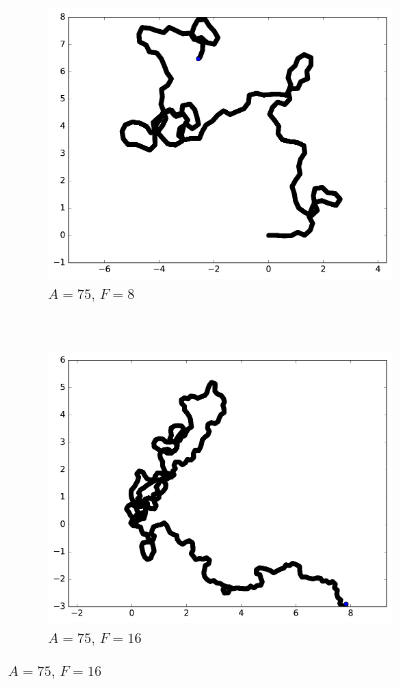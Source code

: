 \begin{appendices}
\begin{figure}[htbp]
\begin{subfigure}[t]{\subImgWmo}
		\end{subfigure}
		~
		\begin{subfigure}[t]{\subImgWmo}
			\centering
			\includegraphics[width=\textwidth]{figures/ch3/synTraj_219_75_8}
			\caption[$A = 75$, $F=8$]{$A = 75$, $F=8$}
			\label{fig:synTraj_219_75_8}
		\end{subfigure}
		~
		\begin{subfigure}[t]{\subImgWmo}
			\centering
			\includegraphics[width=\textwidth]{figures/ch3/synTraj_219_75_16}
			\caption[$A = 75$, $F=16$]{$A = 75$, $F=16$}
			\label{fig:synTraj_219_75_16}
		\end{subfigure}

\end{figure}
\end{appendices}
